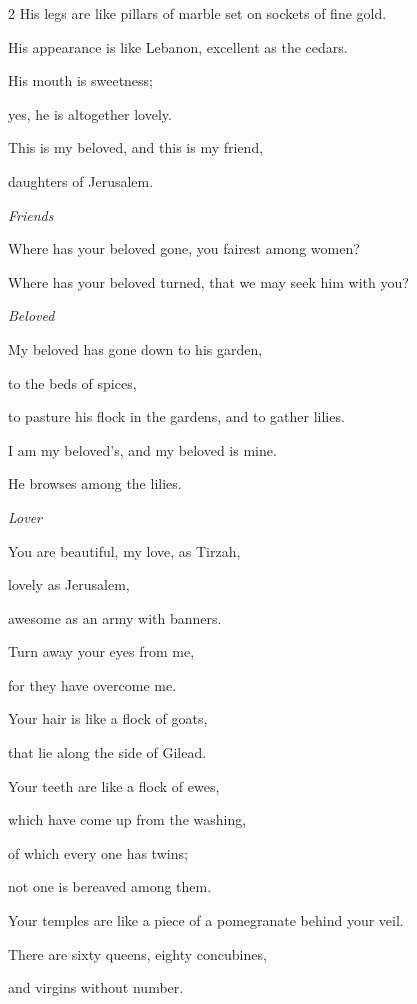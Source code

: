 \begin{multicols}{2}
\myverse{}His legs are like pillars of marble set on sockets of fine gold.

His appearance is like Lebanon, excellent as the cedars.

\myverse{}His mouth is sweetness;

yes, he is altogether lovely.

This is my beloved, and this is my friend,

daughters of Jerusalem.


\mychapter{}\textit{Friends}

\myverse*{}Where has your beloved gone, you fairest among women?

Where has your beloved turned, that we may seek him with you?


\textit{Beloved}

\myverse{}My beloved has gone down to his garden,

to the beds of spices,

to pasture his flock in the gardens, and to gather lilies.

\myverse{}I am my beloved’s, and my beloved is mine.

He browses among the lilies.


\vspace{\baselineskip} 

\textit{Lover}

\myverse{}You are beautiful, my love, as Tirzah,

lovely as Jerusalem,

awesome as an army with banners.

\myverse{}Turn away your eyes from me,

for they have overcome me.

Your hair is like a flock of goats,

that lie along the side of Gilead.

\myverse{}Your teeth are like a flock of ewes,

which have come up from the washing,

of which every one has twins;

not one is bereaved among them.

\myverse{}Your temples are like a piece of a pomegranate behind your veil.


\vspace{\baselineskip}

 \myverse{}There are sixty queens, eighty concubines,

and virgins without number.


\end{multicols}
